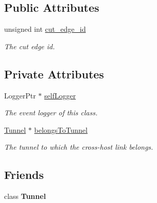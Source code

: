 \subsection*{\-Public \-Attributes}
\begin{DoxyCompactItemize}
\item 
\hypertarget{classCutEdge_af1eb17c9ebb1ce4fcb67b40a92bfbe88}{unsigned int \hyperlink{classCutEdge_af1eb17c9ebb1ce4fcb67b40a92bfbe88}{cut\-\_\-edge\-\_\-id}}\label{classCutEdge_af1eb17c9ebb1ce4fcb67b40a92bfbe88}

\begin{DoxyCompactList}\small\item\em \-The cut edge id. \end{DoxyCompactList}\end{DoxyCompactItemize}
\subsection*{\-Private \-Attributes}
\begin{DoxyCompactItemize}
\item 
\hypertarget{classCutEdge_a46c157e199743651fbf7836f8441228b}{\-Logger\-Ptr $\ast$ \hyperlink{classCutEdge_a46c157e199743651fbf7836f8441228b}{self\-Logger}}\label{classCutEdge_a46c157e199743651fbf7836f8441228b}

\begin{DoxyCompactList}\small\item\em \-The event logger of this class. \end{DoxyCompactList}\item 
\hypertarget{classCutEdge_a2c712271a4b9c321e5408faeaf934153}{\hyperlink{classTunnel}{\-Tunnel} $\ast$ \hyperlink{classCutEdge_a2c712271a4b9c321e5408faeaf934153}{belongs\-To\-Tunnel}}\label{classCutEdge_a2c712271a4b9c321e5408faeaf934153}

\begin{DoxyCompactList}\small\item\em \-The tunnel to which the cross-\/host link belongs. \end{DoxyCompactList}\end{DoxyCompactItemize}
\subsection*{\-Friends}
\begin{DoxyCompactItemize}
\item 
\hypertarget{classCutEdge_a8ec4a0482122250d43ff5a0eecc335c8}{class {\bfseries \-Tunnel}}\label{classCutEdge_a8ec4a0482122250d43ff5a0eecc335c8}

\end{DoxyCompactItemize}


